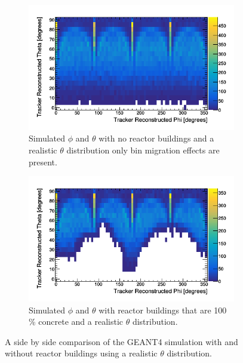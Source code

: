 \begin{figure}[htbp]
\centering
\begin{subfigure}{.5\textwidth}
  \centering
  \includegraphics[width=\linewidth]{Chapter5/Figs/wylfaRasterNew/thetaVsPhiSimulatedWithReactor0.png}
  \captionsetup{width=.9\linewidth}
  \caption{Simulated $\phi$ and $\theta$ with no reactor buildings and a realistic $\theta$ distribution only bin migration effects are present.}
  \label{subFig:thetaVsPhiSimulatedWithReactor0}
\end{subfigure}%
\begin{subfigure}{.5\textwidth}
  \centering
\includegraphics[width=\linewidth]{Chapter5/Figs/wylfaRasterNew/thetaVsPhiSimulatedWithReactor100.png}
  \captionsetup{width=.9\linewidth}
  \caption{Simulated $\phi$ and $\theta$ with reactor buildings that are 100\,\% concrete and a realistic $\theta$ distribution.}
  \label{subFig:thetaVsPhiSimulatedWithReactor100}
\end{subfigure}
\caption{A side by side comparison of the GEANT4 simulation with and without reactor buildings using a realistic $\theta$ distribution.}
\label{fig:thetaVsPhiSimulatedWithReactor_0-100}
\end{figure}

